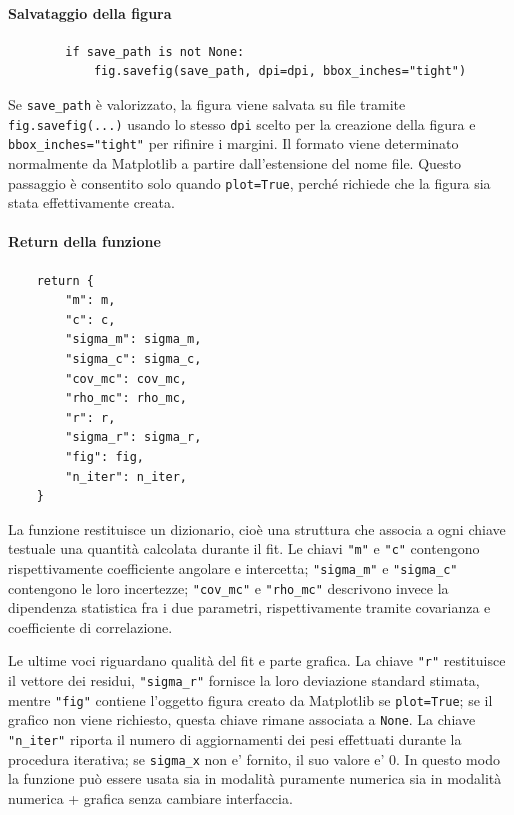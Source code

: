 \paragraph{Salvataggio della figura}
\begin{verbatim}
        if save_path is not None:
            fig.savefig(save_path, dpi=dpi, bbox_inches="tight")
\end{verbatim}

Se \texttt{save\_path} è valorizzato, la figura viene salvata su file tramite \texttt{fig.savefig(...)} usando lo stesso \texttt{dpi} scelto per la creazione della figura e \texttt{bbox\_inches="tight"} per rifinire i margini. Il formato viene determinato normalmente da Matplotlib a partire dall'estensione del nome file. Questo passaggio è consentito solo quando \texttt{plot=True}, perché richiede che la figura sia stata effettivamente creata.

\paragraph{Return della funzione}
\begin{verbatim}
    return {
        "m": m,
        "c": c,
        "sigma_m": sigma_m,
        "sigma_c": sigma_c,
        "cov_mc": cov_mc,
        "rho_mc": rho_mc,
        "r": r,
        "sigma_r": sigma_r,
        "fig": fig,
        "n_iter": n_iter,
    }
\end{verbatim}

La funzione restituisce un dizionario, cioè una struttura che associa a ogni chiave testuale una quantità calcolata durante il fit. Le chiavi \texttt{"m"} e \texttt{"c"} contengono rispettivamente coefficiente angolare e intercetta; \texttt{"sigma\_m"} e \texttt{"sigma\_c"} contengono le loro incertezze; \texttt{"cov\_mc"} e \texttt{"rho\_mc"} descrivono invece la dipendenza statistica fra i due parametri, rispettivamente tramite covarianza e coefficiente di correlazione.

Le ultime voci riguardano qualità del fit e parte grafica. La chiave \texttt{"r"} restituisce il vettore dei residui, \texttt{"sigma\_r"} fornisce la loro deviazione standard stimata, mentre \texttt{"fig"} contiene l'oggetto figura creato da Matplotlib se \texttt{plot=True}; se il grafico non viene richiesto, questa chiave rimane associata a \texttt{None}. La chiave \texttt{"n\_iter"} riporta il numero di aggiornamenti dei pesi effettuati durante la procedura iterativa; se \texttt{sigma\_x} non e' fornito, il suo valore e' 0. In questo modo la funzione può essere usata sia in modalità puramente numerica sia in modalità numerica + grafica senza cambiare interfaccia.
